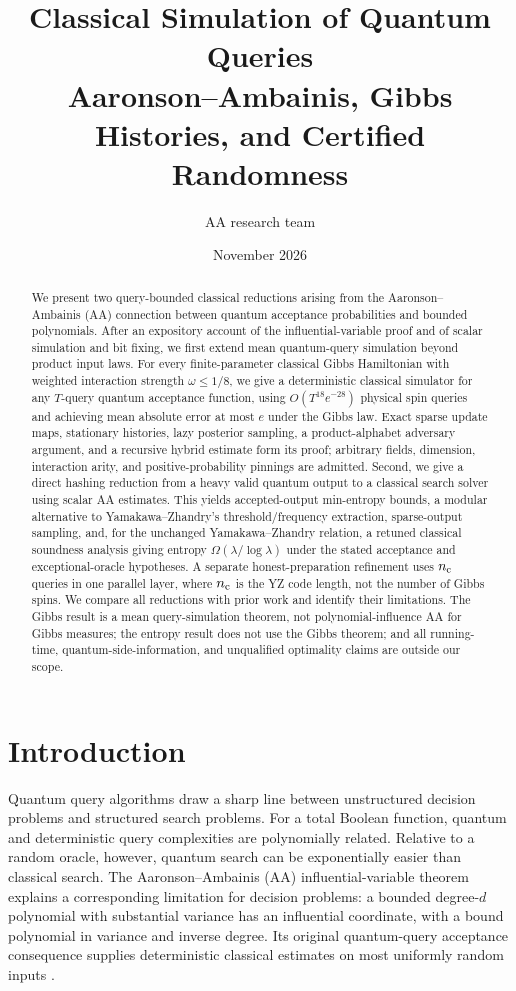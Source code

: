 \documentclass[11pt]{article}
\title{\textbf{Classical Simulation of Quantum Queries}\\[5pt]
{\Large Aaronson--Ambainis, Gibbs Histories, and Certified Randomness}}
\author{AA research team}
\date{November 2026}
\theoremstyle{definition}\newtheorem{definition}[theorem]{Definition}
\theoremstyle{remark}\newtheorem{remark}[theorem]{Remark}
\begin{document}
\maketitle
\thispagestyle{fancy}
\begin{abstract}
\noindent
We present two query-bounded classical reductions arising from the Aaronson--Ambainis (AA) connection between quantum acceptance probabilities and bounded polynomials. After an expository account of the influential-variable proof and of scalar simulation and bit fixing, we first extend mean quantum-query simulation beyond product input laws. For every finite-parameter classical Gibbs Hamiltonian with weighted interaction strength $\omega\leq1/8$, we give a deterministic classical simulator for any $T$-query quantum acceptance function, using $O(T^{18}e^{-28})$ physical spin queries and achieving mean absolute error at most $e$ under the Gibbs law. Exact sparse update maps, stationary histories, lazy posterior sampling, a product-alphabet adversary argument, and a recursive hybrid estimate form its proof; arbitrary fields, dimension, interaction arity, and positive-probability pinnings are admitted. Second, we give a direct hashing reduction from a heavy valid quantum output to a classical search solver using scalar AA estimates. This yields accepted-output min-entropy bounds, a modular alternative to Yamakawa--Zhandry's threshold/frequency extraction, sparse-output sampling, and, for the unchanged Yamakawa--Zhandry relation, a retuned classical soundness analysis giving entropy $\Omega(\lambda/\log\lambda)$ under the stated acceptance and exceptional-oracle hypotheses. A separate honest-preparation refinement uses $n_{\rm c}$ queries in one parallel layer, where $n_{\rm c}$ is the YZ code length, not the number of Gibbs spins. We compare all reductions with prior work and identify their limitations. The Gibbs result is a mean query-simulation theorem, not polynomial-influence AA for Gibbs measures; the entropy result does not use the Gibbs theorem; and all running-time, quantum-side-information, and unqualified optimality claims are outside our scope.
\end{abstract}
\tableofcontents
\clearpage

\section{Introduction}\label{sec:introduction}
Quantum query algorithms draw a sharp line between unstructured decision problems and structured search problems. For a total Boolean function, quantum and deterministic query complexities are polynomially related. Relative to a random oracle, however, quantum search can be exponentially easier than classical search. The Aaronson--Ambainis (AA) influential-variable theorem explains a corresponding limitation for decision problems: a bounded degree-$d$ polynomial with substantial variance has an influential coordinate, with a bound polynomial in variance and inverse degree. Its original quantum-query acceptance consequence supplies deterministic classical estimates on most uniformly random inputs \cite{AA14,Tur26,BDST26}.
\end{document}
